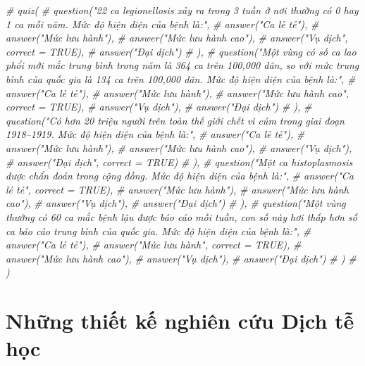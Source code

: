 \documentclass[
]{book}
\newenvironment{Shaded}{\begin{snugshade}}{\end{snugshade}}
\newcommand{\CommentTok}[1]{\textcolor[rgb]{0.56,0.35,0.01}{\textit{#1}}}
\begin{document}
\begin{Shaded}
\begin{Highlighting}[]
\CommentTok{\# quiz(}
\CommentTok{\#   question("22 ca legionellosis xảy ra trong 3 tuần ở nơi thường có 0 hay 1 ca mỗi năm. Mức độ hiện diện của bệnh là:",}
\CommentTok{\#     answer("Ca lẻ tẻ"),}
\CommentTok{\#     answer("Mức lưu hành"),}
\CommentTok{\#     answer("Mức lưu hành cao"),}
\CommentTok{\#     answer("Vụ dịch", correct = TRUE),}
\CommentTok{\#     answer("Đại dịch")}
\CommentTok{\#   ),}
\CommentTok{\#   question("Một vùng có số ca lao phổi mới mắc trung bình trong năm là 364 ca trên 100,000 dân, so với mức trung bình của quốc gia là 134 ca trên 100,000 dân. Mức độ hiện diện của bệnh là:",}
\CommentTok{\#     answer("Ca lẻ tẻ"),}
\CommentTok{\#     answer("Mức lưu hành"),}
\CommentTok{\#     answer("Mức lưu hành cao", correct = TRUE),}
\CommentTok{\#     answer("Vụ dịch"),}
\CommentTok{\#     answer("Đại dịch")}
\CommentTok{\#   ),}
\CommentTok{\#   question("Có hơn 20 triệu người trên toàn thế giới chết vì cúm trong giai đoạn 1918–1919. Mức độ hiện diện của bệnh là:",}
\CommentTok{\#     answer("Ca lẻ tẻ"),}
\CommentTok{\#     answer("Mức lưu hành"),}
\CommentTok{\#     answer("Mức lưu hành cao"),}
\CommentTok{\#     answer("Vụ dịch"),}
\CommentTok{\#     answer("Đại dịch", correct = TRUE)}
\CommentTok{\#   ),}
\CommentTok{\#   question("Một ca histoplasmosis được chẩn đoán trong cộng đồng. Mức độ hiện diện của bệnh là:",}
\CommentTok{\#     answer("Ca lẻ tẻ", correct = TRUE),}
\CommentTok{\#     answer("Mức lưu hành"),}
\CommentTok{\#     answer("Mức lưu hành cao"),}
\CommentTok{\#     answer("Vụ dịch"),}
\CommentTok{\#     answer("Đại dịch")}
\CommentTok{\#   ),}
\CommentTok{\#   question("Một vùng thường có 60 ca mắc bệnh lậu được báo cáo mỗi tuần, con số này hơi thấp hơn số ca báo cáo trung bình của quốc gia. Mức độ hiện diện của bệnh là:",}
\CommentTok{\#     answer("Ca lẻ tẻ"),}
\CommentTok{\#     answer("Mức lưu hành", correct = TRUE),}
\CommentTok{\#     answer("Mức lưu hành cao"),}
\CommentTok{\#     answer("Vụ dịch"),}
\CommentTok{\#     answer("Đại dịch")}
\CommentTok{\#   )}
\CommentTok{\# )}
\end{Highlighting}
\end{Shaded}

\hypertarget{dthcb_thietke}{%
\chapter{Những thiết kế nghiên cứu Dịch tễ học}\label{dthcb_thietke}}
\end{document}

